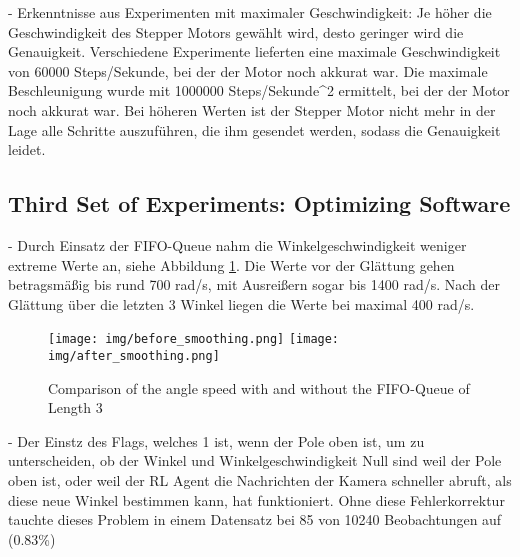- Erkenntnisse aus Experimenten mit maximaler Geschwindigkeit: Je höher die Geschwindigkeit des Stepper Motors gewählt wird, desto geringer wird die Genauigkeit. Verschiedene Experimente lieferten eine maximale Geschwindigkeit von 60000 Steps/Sekunde, bei der der Motor noch akkurat war. Die maximale Beschleunigung wurde mit 1000000 Steps/Sekunde^2 ermittelt, bei der der Motor noch akkurat war. Bei höheren Werten ist der Stepper Motor nicht mehr in der Lage alle Schritte auszuführen, die ihm gesendet werden, sodass die Genauigkeit leidet.

\subsection{Third Set of Experiments: Optimizing Software}
- Durch Einsatz der FIFO-Queue nahm die Winkelgeschwindigkeit weniger extreme Werte an, siehe Abbildung \ref{fig:before_after_smoothing}. Die Werte vor der Glättung gehen betragsmäßig bis rund 700 rad/s, mit Ausreißern sogar bis 1400 rad/s. Nach der Glättung über die letzten 3 Winkel liegen die Werte bei maximal 400 rad/s.
\begin{figure}[htbp]
    \centering
    \texttt{[image: img/before\_smoothing.png]}
    \texttt{[image: img/after\_smoothing.png]}
    \caption{Comparison of the angle speed with and without the FIFO-Queue of Length 3}
    \label{fig:before_after_smoothing}
\end{figure}
- Der Einstz des Flags, welches 1 ist, wenn der Pole oben ist, um zu unterscheiden, ob der Winkel und Winkelgeschwindigkeit Null sind weil der Pole oben ist, oder weil der RL Agent die Nachrichten der Kamera schneller abruft, als diese neue Winkel bestimmen kann, hat funktioniert. Ohne diese Fehlerkorrektur tauchte dieses Problem in einem Datensatz bei 85 von 10240 Beobachtungen auf (0.83\%)

